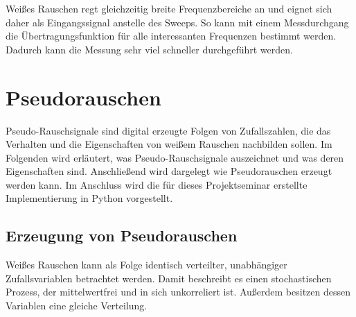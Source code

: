 \documentclass[12pt,report,final,twoside,accentcolor=tud9b,bigchapter]{tudreport}
\begin{document}
Weißes Rauschen regt gleichzeitig breite Frequenzbereiche an und eignet sich daher als Eingangssignal anstelle des Sweeps. So kann mit einem Messdurchgang die Übertragungsfunktion für alle interessanten Frequenzen bestimmt werden. Dadurch kann die Messung sehr viel schneller durchgeführt werden. \citep{skript}

\chapter{Pseudorauschen} \label{cha:rauschen}
Pseudo-Rauschsignale sind digital erzeugte Folgen von Zufallszahlen, die das Verhalten und die Eigenschaften von weißem Rauschen nachbilden sollen. Im Folgenden wird erläutert, was Pseudo-Rauschsignale auszeichnet und was deren Eigenschaften sind. Anschließend wird dargelegt wie Pseudorauschen erzeugt werden kann. Im Anschluss wird die für dieses Projektseminar erstellte Implementierung in Python vorgestellt. \citep{skript}



\section{Erzeugung von Pseudorauschen}
Weißes Rauschen kann als Folge identisch verteilter, unabhängiger Zufallsvariablen betrachtet werden. Damit beschreibt es einen stochastischen Prozess, der mittelwertfrei und in sich unkorreliert ist. Außerdem besitzen dessen Variablen eine gleiche Verteilung. \citep{skript, Nachrichtentechnik}
\end{document}
